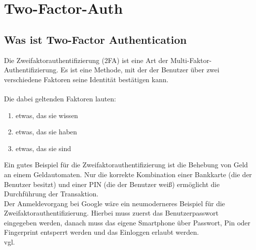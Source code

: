 \section{Two-Factor-Auth}
\label{sec:2fa}
\subsection{Was ist Two-Factor Authentication}
Die Zweifaktorauthentifizierung (2FA) ist eine Art der Multi-Faktor-\\Authentifizierung. Es ist eine Methode, mit der der Benutzer über zwei verschiedene Faktoren seine Identität bestätigen kann.\\ \\
Die dabei geltenden Faktoren lauten:
\begin{enumerate}
\item etwas, das sie wissen
\item etwas, das sie haben
\item etwas, das sie sind
\end{enumerate}
Ein gutes Beispiel für die Zweifaktorauthentifizierung ist die Behebung von Geld an einem Geldautomaten. Nur die korrekte Kombination einer Bankkarte (die der Benutzer besitzt) und einer PIN (die der Benutzer weiß) ermöglicht die Durchführung der Transaktion.\\Der Anmeldevorgang bei Google wäre ein neumoderneres Beispiel für die Zweifaktorauthentifizierung. Hierbei muss zuerst das Benutzerpasswort eingegeben werden, danach muss das eigene Smartphone über Passwort, Pin oder Fingerprint entsperrt werden und das Einloggen erlaubt werden. 
\\ vgl. \textcite{2FA}
